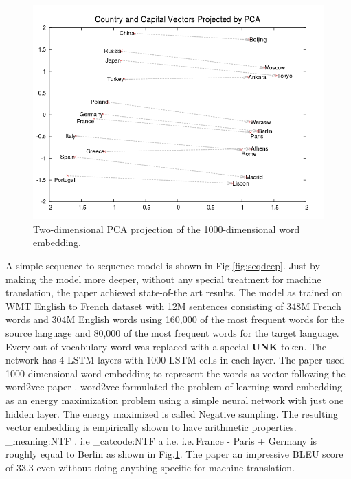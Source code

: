 \documentclass[conference]{IEEEtran}
\makeatletter
\newcommand\latinabbrev[1]{
  \peek_meaning:NTF . {%
    #1\@}%
  { \peek_catcode:NTF a {%
      #1.\@ }%
    {#1.\@}}}
\def\ie{\latinabbrev{i.e}}
\makeatother
\begin{document}
 \begin{figure}
  \centering
      \includegraphics[width=.9\linewidth]{img/wordvec.png} 
	\caption{Two-dimensional PCA projection of the 1000-dimensional word embedding.}
	\label{fig:wordvec}
\end{figure}
A simple sequence to sequence model is shown in  Fig.\ref{fig:seqdeep}. Just by making the model more deeper, without any special treatment for machine translation, the paper achieved state-of-the art results. The model as trained on WMT English to French dataset with 12M sentences consisting of 348M French words and 304M English words using 160,000 of the most frequent words for the source language and 80,000 of the most frequent words for the target language. Every out-of-vocabulary word was replaced with a special \textbf{UNK} token. The network has 4 LSTM layers with 1000 LSTM cells in each layer. The paper used 1000 dimensional word embedding to represent the words as vector following the word2vec paper \cite{mikolov2013distributed}. word2vec formulated the problem of learning word embedding as an energy maximization problem using a simple neural network with just one hidden layer. The energy maximized is called Negative sampling. The resulting vector embedding is empirically shown to have arithmetic properties. \ie  $\,$France - Paris + Germany is roughly equal to Berlin as shown in Fig.\ref{fig:wordvec}. The paper an impressive BLEU score of 33.3 even without doing anything specific for machine translation.
\end{document}
